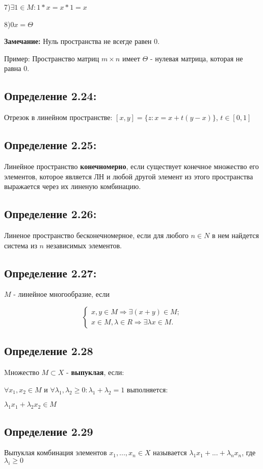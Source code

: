 \documentclass[12pt, english]{article}
\begin{document}
	7)$\exists 1 \in M: 1*x = x * 1 = x$
	
	8)$0x = \Theta$

\textbf{Замечание:}
	Нуль пространства не всегде равен 0.
	
	Пример: Пространство матриц $m \times n$ имеет $\Theta$ - нулевая матрица, которая не равна 0.
	
\subsection*{Определение 2.24:}
	Отрезок в линейном пространстве: $[x,y] = \{ z : x = x + t(y-x) \}$, $t \in [0,1]$
\subsection*{Определение 2.25:}
	Линейное пространство \textbf{конечномерно}, если существует конечное множество его элементов, которое является ЛН и любой другой
	элемент из этого пространства выражается через их линеную комбинацию.
	

	
\subsection*{Определение 2.26:}
	Линеное пространство бесконечномерное, если для любого $n \in N$  в нем найдется система из $n$ независимых элементов.
	
\subsection*{Определение 2.27:}
 	$M$ - линейное многообразие, если 	
	
$$
\begin{cases}
   x,y \in M \Rightarrow \exists (x+y) \in M; \\
   x \in M , \lambda \in R \Rightarrow \exists \lambda x \in M.
\end{cases}
$$

\subsection*{Определение 2.28}
	Mножество $M \subset X$ - \textbf{выпуклая}, если:
	
	$\forall x_1, x_2 \in M$ и $\forall \lambda_1 , \lambda_2 \ge 0 : \lambda_1 + \lambda_2 = 1$ выполняется:
	
	$\lambda_1 x_1 + \lambda_2 x_2 \in M$
	
\subsection*{Определение 2.29}
	Выпуклая комбинация элементов $x_1, ..., x_n \in X$ называется $\lambda_1 x_1 + ... + \lambda_n x_n$, где 
	$\lambda_i \ge 0$
\end{document}
